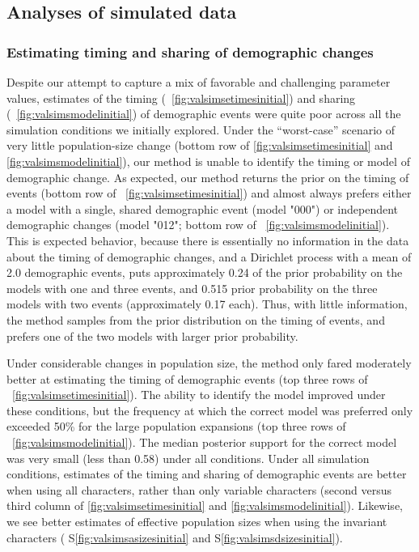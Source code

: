 \subsection{Analyses of simulated data}

\subsubsection{Estimating timing and sharing of demographic changes}

Despite our attempt to capture a mix of favorable and challenging parameter
values,
estimates of the timing
(\fig{}~\ref{fig:valsimsetimesinitial})
and sharing
(\fig{}~\ref{fig:valsimsmodelinitial})
of demographic events were quite poor across all the simulation conditions
we initially explored.
Under the ``worst-case'' scenario of very little population-size change
(bottom row of \figs \ref{fig:valsimsetimesinitial} and
\ref{fig:valsimsmodelinitial}),
our method is unable to identify the timing or model of demographic change.
As expected, our method returns the prior on the timing of events
(bottom row of \fig{}~\ref{fig:valsimsetimesinitial})
and almost always prefers either a model with a single, shared demographic
event (model "000") or independent demographic changes (model "012";
bottom row of \fig{}~\ref{fig:valsimsmodelinitial}).
This is expected behavior, because there is essentially no information in the
data about the timing of demographic changes, and a Dirichlet process with a
mean of 2.0 demographic events, puts approximately 0.24 of the prior
probability on the models with one and three events, and 0.515 prior
probability on the three models with two events (approximately 0.17 each).
Thus, with little information, the method samples from the prior distribution
on the timing of events, and prefers one of the two models with larger prior
probability.

\ifembed{

}{}

\ifembed{

}{}

Under considerable changes in population size, the method only fared
moderately better at estimating the timing of demographic events
(top three rows of \fig{}~\ref{fig:valsimsetimesinitial}).
The ability to identify the model improved under these
conditions, but the frequency at which the correct model
was preferred only exceeded 50\% for the large population
expansions
(top three rows of \fig{}~\ref{fig:valsimsmodelinitial}).
The median posterior support for the correct model was very small (less than
0.58) under all conditions.
Under all simulation conditions, estimates of the timing and sharing of
demographic events are better when using all characters, rather than only
variable characters
(second versus third column of \figs
\ref{fig:valsimsetimesinitial}
and
\ref{fig:valsimsmodelinitial}).
Likewise, we see better estimates of effective population sizes when using the
invariant characters
(\figs
S\ref{fig:valsimsasizesinitial}
and
S\ref{fig:valsimsdsizesinitial}).


